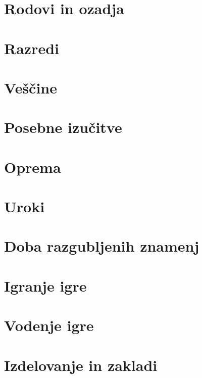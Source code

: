 \documentclass[10pt,a4paper,twocolumn,openany]{book}
\begin{document}
\newcommand{\oneaction}{♦}
\newcommand{\twoactions}{♦♦}
\newcommand{\threeactions}{♦♦♦}
\newcommand{\freeaction}{◇}
\newcommand{\reaction}{↺}

\frontmatter

\rpgMakeCover[
    image = img/cover,
    logo = img/logo,
    title = Stezosledec\\\Huge{Druga izdaja},
    subtitle = Osnovna pravila igre Pathfinder 2e\\Prevedel Grimpy
]



\tableofcontents



\chapter{Rodovi in ozadja}

\chapter{Razredi}

\chapter{Veščine}

\chapter{Posebne izučitve}

\chapter{Oprema}

\chapter{Uroki}

\chapter{Doba razgubljenih znamenj}

\chapter{Igranje igre}

\chapter{Vodenje igre}

\chapter{Izdelovanje in zakladi}
\end{document}
